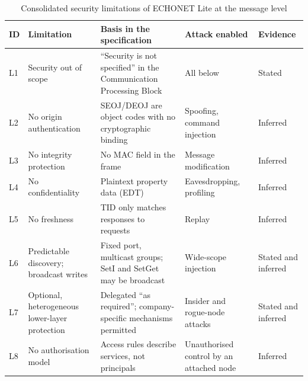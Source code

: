 \begin{table}[htbp]
  \centering
  \caption{Consolidated security limitations of ECHONET Lite at the message level}
  \label{tab:flaws}
  \footnotesize
  \renewcommand{\arraystretch}{1.2}
  \begin{tabularx}{\textwidth}{@{}l >{\raggedright\arraybackslash}p{3.3cm} >{\raggedright\arraybackslash}X >{\raggedright\arraybackslash}p{2.9cm} l@{}}
    \toprule
    \textbf{ID} & \textbf{Limitation}                            & \textbf{Basis in the specification}                                                       & \textbf{Attack enabled}                  & \textbf{Evidence}   \\
    \midrule
    L1          & Security out of scope                          & ``Security is not specified'' in the Communication Processing Block \cite{ECHONETPart2}   & All below                                & Stated              \\
    L2          & No origin authentication                       & SEOJ/DEOJ are object codes with no cryptographic binding                                  & Spoofing, command injection              & Inferred            \\
    L3          & No integrity protection                        & No MAC field in the frame                                                                 & Message modification                     & Inferred            \\
    L4          & No confidentiality                             & Plaintext property data (EDT)                                                             & Eavesdropping, profiling                 & Inferred            \\
    L5          & No freshness                                   & TID only matches responses to requests                                                    & Replay                                   & Inferred            \\
    L6          & Predictable discovery; broadcast writes        & Fixed port, multicast groups; SetI and SetGet may be broadcast                            & Wide-scope injection                     & Stated and inferred \\
    L7          & Optional, heterogeneous lower-layer protection & Delegated ``as required''; company-specific mechanisms permitted \cite{ECHONETGuidelines} & Insider and rogue-node attacks           & Stated and inferred \\
    L8          & No authorisation model                         & Access rules describe services, not principals                                            & Unauthorised control by an attached node & Inferred            \\

\end{tabularx}
\end{table}
